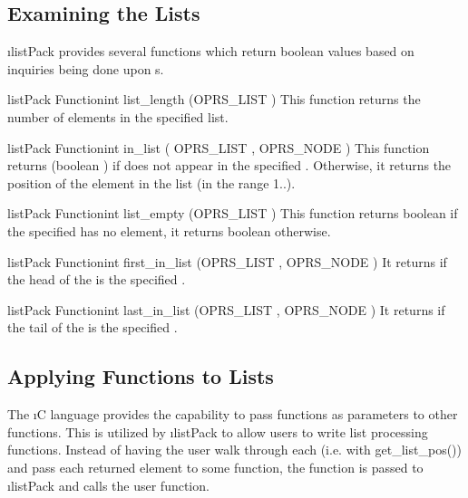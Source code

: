 \subsection{Examining the Lists}

\i{listPack} provides several functions which return boolean values
based on inquiries being done upon s.

\begin{typefn}{listPack Function}{int} {list\_length} {(OPRS\_LIST )}
This function returns the number of elements in the specified list.
\end{typefn}

\begin{typefn}{listPack Function}{int} {in\_list} {( OPRS\_LIST , OPRS\_NODE
)}
This function returns  (boolean ) if  does not appear in the specified .
Otherwise, it returns the position of the element in the list (in the range
1..).
\end{typefn}

\begin{typefn}{listPack Function}{int} {list\_empty} {(OPRS\_LIST )}
This function returns boolean  if the specified  has no
element, it returns boolean  otherwise.
\end{typefn}

\begin{typefn}{listPack Function}{int} {first\_in\_list} {(OPRS\_LIST , OPRS\_NODE
)}
It returns  if the head of the  is the specified
.
\end{typefn}

\begin{typefn}{listPack Function}{int} {last\_in\_list} {(OPRS\_LIST , OPRS\_NODE
)}
It returns  if the tail of the  is the specified
.
\end{typefn}

\subsection{Applying Functions to Lists}

The \i{C} language provides the capability to pass functions as parameters to
other functions. This is utilized by \i{listPack} to allow users to write list
processing functions. Instead of having the user walk through each
 (i.e. with get\_list\_pos()) and pass each returned element to
some function, the function is passed to \i{listPack} and calls the user
function.


